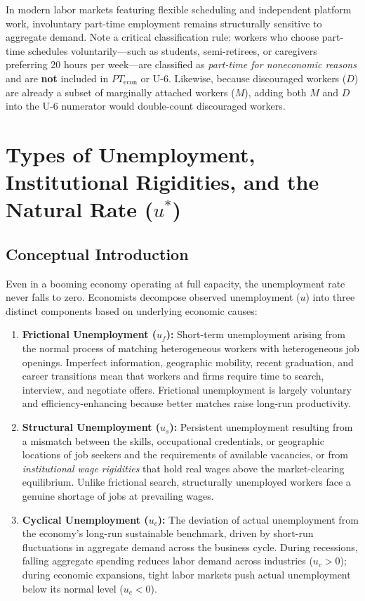 \documentclass[11pt, a4paper]{article}
\begin{document}
In modern labor markets featuring flexible scheduling and independent platform work, involuntary part-time employment remains structurally sensitive to aggregate demand. Note a critical classification rule: workers who choose part-time schedules voluntarily—such as students, semi-retirees, or caregivers preferring 20 hours per week—are classified as \textit{part-time for noneconomic reasons} and are \textbf{not} included in $PT_{\text{econ}}$ or U-6. Likewise, because discouraged workers ($D$) are already a subset of marginally attached workers ($M$), adding both $M$ and $D$ into the U-6 numerator would double-count discouraged workers.

\section{Types of Unemployment, Institutional Rigidities, and the Natural Rate ($u^*$)}

\subsection*{Conceptual Introduction}
Even in a booming economy operating at full capacity, the unemployment rate never falls to zero. Economists decompose observed unemployment ($u$) into three distinct components based on underlying economic causes:
\begin{enumerate}[leftmargin=1.5em, itemsep=3pt]
  \item \textbf{Frictional Unemployment ($u_f$):} Short-term unemployment arising from the normal process of matching heterogeneous workers with heterogeneous job openings. Imperfect information, geographic mobility, recent graduation, and career transitions mean that workers and firms require time to search, interview, and negotiate offers. Frictional unemployment is largely voluntary and efficiency-enhancing because better matches raise long-run productivity.
  \item \textbf{Structural Unemployment ($u_s$):} Persistent unemployment resulting from a mismatch between the skills, occupational credentials, or geographic locations of job seekers and the requirements of available vacancies, or from \textit{institutional wage rigidities} that hold real wages above the market-clearing equilibrium. Unlike frictional search, structurally unemployed workers face a genuine shortage of jobs at prevailing wages.
  \item \textbf{Cyclical Unemployment ($u_c$):} The deviation of actual unemployment from the economy's long-run sustainable benchmark, driven by short-run fluctuations in aggregate demand across the business cycle. During recessions, falling aggregate spending reduces labor demand across industries ($u_c > 0$); during economic expansions, tight labor markets push actual unemployment below its normal level ($u_c < 0$).
\end{enumerate}
\end{document}
